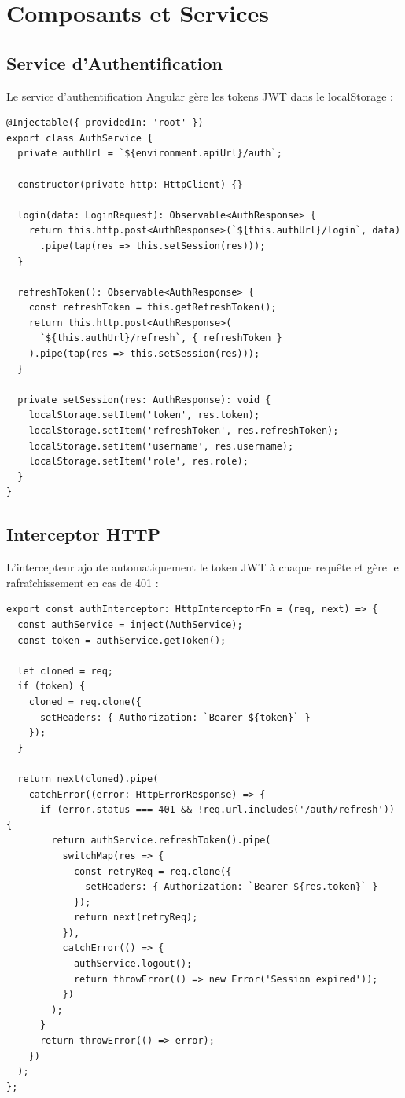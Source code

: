 \documentclass[12pt,a4paper,twoside]{report}
\begin{document}
\section{Composants et Services}

\subsection{Service d'Authentification}
Le service d'authentification Angular gère les tokens JWT dans le localStorage :

\begin{lstlisting}[style=typescriptStyle, caption=AuthService Angular]
@Injectable({ providedIn: 'root' })
export class AuthService {
  private authUrl = `${environment.apiUrl}/auth`;

  constructor(private http: HttpClient) {}

  login(data: LoginRequest): Observable<AuthResponse> {
    return this.http.post<AuthResponse>(`${this.authUrl}/login`, data)
      .pipe(tap(res => this.setSession(res)));
  }

  refreshToken(): Observable<AuthResponse> {
    const refreshToken = this.getRefreshToken();
    return this.http.post<AuthResponse>(
      `${this.authUrl}/refresh`, { refreshToken }
    ).pipe(tap(res => this.setSession(res)));
  }

  private setSession(res: AuthResponse): void {
    localStorage.setItem('token', res.token);
    localStorage.setItem('refreshToken', res.refreshToken);
    localStorage.setItem('username', res.username);
    localStorage.setItem('role', res.role);
  }
}
\end{lstlisting}

\subsection{Interceptor HTTP}
L'intercepteur ajoute automatiquement le token JWT à chaque requête et gère le rafraîchissement en cas de 401 :

\begin{lstlisting}[style=typescriptStyle, caption=Auth Interceptor]
export const authInterceptor: HttpInterceptorFn = (req, next) => {
  const authService = inject(AuthService);
  const token = authService.getToken();

  let cloned = req;
  if (token) {
    cloned = req.clone({
      setHeaders: { Authorization: `Bearer ${token}` }
    });
  }

  return next(cloned).pipe(
    catchError((error: HttpErrorResponse) => {
      if (error.status === 401 && !req.url.includes('/auth/refresh')) {
        return authService.refreshToken().pipe(
          switchMap(res => {
            const retryReq = req.clone({
              setHeaders: { Authorization: `Bearer ${res.token}` }
            });
            return next(retryReq);
          }),
          catchError(() => {
            authService.logout();
            return throwError(() => new Error('Session expired'));
          })
        );
      }
      return throwError(() => error);
    })
  );
};
\end{lstlisting}
\end{document}
